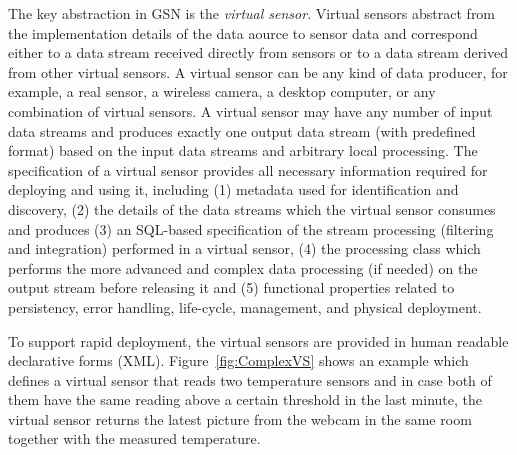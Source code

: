\label{sec:virt-sens-spec}


The key abstraction in GSN is the \textit{virtual sensor}. Virtual
sensors abstract from the implementation details of the data aource to sensor data
and correspond either to a data stream received directly from sensors
or to a data stream derived from other virtual sensors. A virtual
sensor can be any kind of data producer, for example, a real sensor, a
wireless camera, a desktop computer, or any combination of virtual sensors.
A virtual sensor may have any number of input data
streams and produces exactly one output data stream (with predefined format) based on the input
data streams and arbitrary local processing. The specification of a
virtual sensor provides all necessary information required for
deploying and using it, including (1) metadata used for identification
and discovery, (2) the details of the data streams which the virtual
sensor consumes and produces (3) an SQL-based specification of the
stream processing (filtering and integration) performed in a virtual sensor, (4)
the processing class which performs the more advanced and complex data processing (if needed) on the output
stream before releasing it and (5) functional properties related to persistency, error handling, life-cycle,
management, and physical deployment.

To support rapid deployment, the virtual sensors are provided
in human readable declarative forms (XML). Figure~\ref{fig:ComplexVS} shows an
example which defines a virtual sensor that reads two temperature sensors and
in case both of them have the same reading above a certain threshold in the
last minute, the virtual sensor returns the latest picture from the webcam in
the same room together with the measured temperature.


